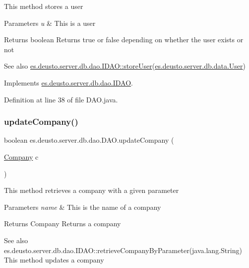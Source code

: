 This method stores a user 
\begin{DoxyParams}{Parameters}
{\em u} & This is a user \\
\hline
\end{DoxyParams}
\begin{DoxyReturn}{Returns}
boolean Returns true or false depending on whether the user exists or not 
\end{DoxyReturn}
\begin{DoxySeeAlso}{See also}
\hyperlink{interfacees_1_1deusto_1_1server_1_1db_1_1dao_1_1_i_d_a_o_ab943216560f43595a852b406dcd394a4}{es.\+deusto.\+server.\+db.\+dao.\+I\+D\+A\+O\+::store\+User}(\hyperlink{classes_1_1deusto_1_1server_1_1db_1_1data_1_1_user}{es.\+deusto.\+server.\+db.\+data.\+User}) 
\end{DoxySeeAlso}


Implements \hyperlink{interfacees_1_1deusto_1_1server_1_1db_1_1dao_1_1_i_d_a_o_ab943216560f43595a852b406dcd394a4}{es.\+deusto.\+server.\+db.\+dao.\+I\+D\+AO}.



Definition at line 38 of file D\+A\+O.\+java.

\mbox{\label{classes_1_1deusto_1_1server_1_1db_1_1dao_1_1_d_a_o_a0748467c3346a5bcdcd79b508562b6dc}} 
\subsubsection{\texorpdfstring{update\+Company()}{updateCompany()}}
{\footnotesize\ttfamily boolean es.\+deusto.\+server.\+db.\+dao.\+D\+A\+O.\+update\+Company (\begin{DoxyParamCaption}\item[{\hyperlink{classes_1_1deusto_1_1server_1_1db_1_1data_1_1_company}{Company}}]{c }\end{DoxyParamCaption})}

This method retrieves a company with a given parameter 
\begin{DoxyParams}{Parameters}
{\em name} & This is the name of a company \\
\hline
\end{DoxyParams}
\begin{DoxyReturn}{Returns}
Company Returns a company 
\end{DoxyReturn}
\begin{DoxySeeAlso}{See also}
es.\+deusto.\+server.\+db.\+dao.\+I\+D\+A\+O\+::retrieve\+Company\+By\+Parameter(java.\+lang.\+String) This method updates a company 
\end{DoxySeeAlso}

